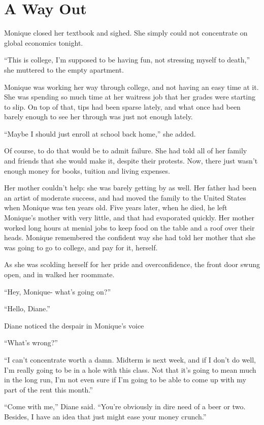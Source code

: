 \chapter{A Way Out}
Monique closed her textbook and sighed. She simply could not concentrate on global economics
tonight.

``This is college, I'm supposed to be having fun, not stressing myself to death,'' she muttered
to the empty apartment.

Monique was working her way through college, and not having an easy time at it. She was spending
so much time at her waitress job that her grades were starting to slip. On top of that, tips had
been sparse lately, and what once had been barely enough to see her through was just not enough
lately.

``Maybe I should just enroll at school back home,'' she added.

Of course, to do that would be to admit failure. She had told all of her family and friends that
she would make it, despite their protests. Now, there just wasn't enough money for books,
tuition and living expenses.

Her mother couldn't help: she was barely getting by as well. Her father had been an artist of
moderate success, and had moved the family to the United States when Monique was ten years old.
Five years later, when he died, he left Monique's mother with very little, and that had
evaporated quickly. Her mother worked long hours at menial jobs to keep food on the table and a
roof over their heads. Monique remembered the confident way she had told her mother that she was
going to go to college, and pay for it, herself.

As she was scolding herself for her pride and overconfidence, the front door swung open, and in
walked her roommate.

``Hey, Monique- what's going on?''

``Hello, Diane.''

Diane noticed the despair in Monique's voice

``What's wrong?''

``I can't concentrate worth a damn. Midterm is next week, and if I don't do well, I'm really
going to be in a hole with this class. Not that it's going to mean much in the long run, I'm not
even sure if I'm going to be able to come up with my part of the rent this month.''

``Come with me,'' Diane said. ``You're obviously in dire need of a beer or two. Besides, I have
an idea that just might ease your money crunch.''

